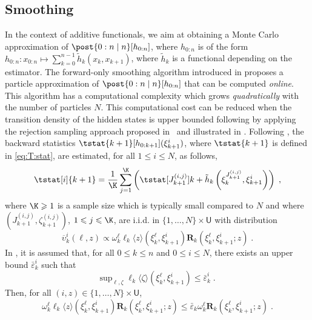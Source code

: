 \documentclass{article}
\newcommand{\af}[1]{h_{#1}}
\newcommand{\addf}[1]{\termletter_{#1}}
\newcommand{\termletter}{\tilde{h}}
\newcommand{\N}{N}
\newcommand{\hkup}{\bar{\varepsilon}}
\newcommand{\bi}[3]{J_{#1}^{(#2, #3)}}
\newcommand{\eqsp}{\;}
\newcommand{\ewght}[2]{\ensuremath{\omega_{#1}^{#2}}}
\newcommand{\epart}[2]{\ensuremath{\xi_{#1}^{#2}}}
\newcommand{\marginalset}{\mathsf{U}}
\newcommand{\kernelmarg}{\mathbf{R}}
\newcommand{\hatqg}[1]{\mathsf{\ell}_{#1}}
\begin{document}
\subsection{Smoothing}
\label{sec:AR}
In the context of additive functionals, we aim at obtaining a Monte Carlo approximation of $\post{0:n \mid n}[\af{0:n}]$, where $\af{0:n}$ is of the form $\af{0:n}: x_{0:n} \mapsto \sum_{k=0}^{n-1}\addf{k}(x_{k},x_{k+1})$, where $\addf{k}$ is a functional depending on the estimator. The forward-only smoothing algorithm introduced in \cite{delmoral2010backward} proposes a particle approximation of  $\post{0:n \mid n}[\af{0:n}]$ that can be computed \textit{online}. 
This algorithm has a computational complexity which  grows \emph{quadratically} with the number of particles $\N$. 
This computational cost can be reduced when the transition density of the hidden states is upper bounded following \cite{olsson2017efficient}  by applying the rejection sampling approach proposed in~\cite{douc2011sequential} and illustrated in \cite{dubarry2011fast}. 
Following \cite{gloaguen2019pseudo}, the backward statistics 
$\tstat{k + 1}[\af{0:k+1}](\epart{k+1}{i})$, where $\tstat{k + 1}$ is defined in \eqref{eq:T:stat},  are estimated, for all $1\leqslant i\leqslant \N$, as follows,
\begin{equation*}
\tstat[i]{k+1}  = \frac{1}{\K} \sum_{j=1}^{\K} \left( \tstat[\bi{k+1}{i}{j}]{k} + \addf{k}\left(\epart{k}{\bi{k+1}{i}{j}}, \epart{k+1}{i}\right)\right)\eqsp,
\end{equation*}
where $\K\geqslant 1$ is a sample size which  is typically small compared to $\N$ and where $(\bi{k+1}{i}{j},\zeta_{k+1}^{(i,j)})$, $1\leqslant j\leqslant \K$, are i.i.d. in $\{1,\ldots,\N\}\times\marginalset$ with distribution 
$$
\overline \upsilon_k^i(\ell,z)\propto\ewght{k}{\ell}\hatqg{k}\langle z\rangle(\epart{k}{\ell},\epart{k+1}{i})\kernelmarg_{k}(\epart{k}{\ell},\epart{k+1}{i};z)\eqsp.
$$
In \cite{gloaguen2018online}, it is assumed that, for all  $0\leqslant k\leqslant n$ and $0\leqslant i\leqslant N$, there exists an upper bound $\hkup^i_k$  such that
\begin{equation}
\mathrm{sup}_{\ell,\zeta}\;\hatqg{k}\langle \zeta\rangle(\epart{k}{\ell},\epart{k+1}{i})\leqslant \hkup^i_k\eqsp. \label{eq:AR:bound}
\end{equation}
Then, for all $(i, z) \in \lbrace 1,\dots,N\rbrace\times\marginalset$,
$$
\ewght{k}{\ell}\hatqg{k}\langle z \rangle(\epart{k}{\ell},\epart{k+1}{i})\kernelmarg_{k}(\epart{k}{\ell},\epart{k+1}{i};z) \leqslant \hkup_k \ewght
{k}{\ell} \kernelmarg_{k}(\epart{k}{\ell},\epart{k+1}{i};z)\eqsp. 
$$
\end{document}
